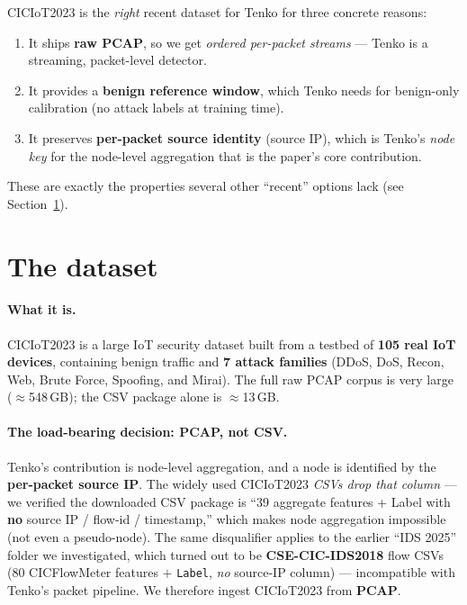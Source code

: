 \documentclass[11pt]{article}
\begin{document}
CICIoT2023 is the \emph{right} recent dataset for Tenko for three concrete reasons:
\begin{enumerate}
  \item It ships \textbf{raw PCAP}, so we get \emph{ordered per-packet streams} --- Tenko is a
        streaming, packet-level detector.
  \item It provides a \textbf{benign reference window}, which Tenko needs for benign-only
        calibration (no attack labels at training time).
  \item It preserves \textbf{per-packet source identity} (source IP), which is Tenko's
        \emph{node key} for the node-level aggregation that is the paper's core contribution.
\end{enumerate}
These are exactly the properties several other ``recent'' options lack (see
Section~\ref{sec:dataset}).

\section{The dataset}
\label{sec:dataset}

\paragraph{What it is.} CICIoT2023 is a large IoT security dataset built from a testbed of
\textbf{105 real IoT devices}, containing benign traffic and \textbf{7 attack families}
(DDoS, DoS, Recon, Web, Brute Force, Spoofing, and Mirai). The full raw PCAP corpus is very large
($\approx$548\,GB); the CSV package alone is $\approx$13\,GB.

\paragraph{The load-bearing decision: PCAP, not CSV.} Tenko's contribution is node-level
aggregation, and a node is identified by the \textbf{per-packet source IP}. The widely used
CICIoT2023 \emph{CSVs drop that column} --- we verified the downloaded CSV package is
``39 aggregate features + Label with \textbf{no} source IP / flow-id / timestamp,'' which makes
node aggregation impossible (not even a pseudo-node). The same disqualifier applies to the earlier
``IDS 2025'' folder we investigated, which turned out to be \textbf{CSE-CIC-IDS2018} flow CSVs
(80 CICFlowMeter features $+$ \texttt{Label}, \emph{no} source-IP column) --- incompatible with
Tenko's packet pipeline. We therefore ingest CICIoT2023 from \textbf{PCAP}.
\end{document}
